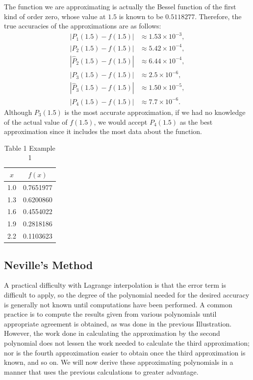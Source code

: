 \begin{example}
The function we are approximating is actually the Bessel function of the first kind of order zero, whose value at $1.5$ is known to be $0.5118277$. Therefore, the true accuracies of the approximations are as follows:
\[\begin{aligned}
\left|P_{1}(1.5)-f(1.5)\right| & \approx 1.53 \times 10^{-3}, \\
\left|P_{2}(1.5)-f(1.5)\right| & \approx 5.42 \times 10^{-4}, \\
\left|\hat{P}_{2}(1.5)-f(1.5)\right| & \approx 6.44 \times 10^{-4}, \\
\left|P_{3}(1.5)-f(1.5)\right| & \approx 2.5 \times 10^{-6}, \\
\left|\hat{P}_{3}(1.5)-f(1.5)\right| & \approx 1.50 \times 10^{-5}, \\
\left|P_{4}(1.5)-f(1.5)\right| & \approx 7.7 \times 10^{-6} .
\end{aligned}\]
Although $P_{3}(1.5)$ is the most accurate approximation, if we had no knowledge of the actual value of $f(1.5)$, we would accept $P_{4}(1.5)$ as the best approximation since it includes the most data about the function.
\end{example}

\begin{table}
\centering
\begin{tabular}{cc}
\hline
$x$ & $f(x)$ \\
\hline
1.0 & 0.7651977 \\
1.3 & 0.6200860 \\
1.6 & 0.4554022 \\
1.9 & 0.2818186 \\
2.2 & 0.1103623 \\
\hline
\end{tabular}
\caption{\scriptsize Table 1 Example 1}
\label{table:dataexample1}
\end{table}

\subsection*{Neville's Method}
A practical difficulty with Lagrange interpolation is that the error term is difficult to apply, so the degree of the polynomial needed for the desired accuracy is generally not known until computations have been performed. A common practice is to compute the results given from various polynomials until appropriate agreement is obtained, as was done in the previous Illustration. However, the work done in calculating the approximation by the second polynomial does not lessen the work needed to calculate the third approximation; nor is the fourth approximation easier to obtain once the third approximation is known, and so on. We will now derive these approximating polynomials in a manner that uses the previous calculations to greater advantage.

